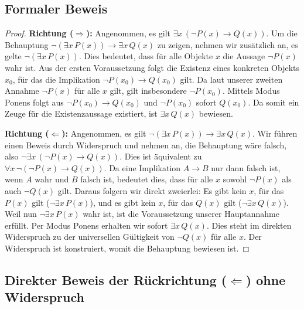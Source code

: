 \documentclass{article}
\begin{document}
\subsection*{Formaler Beweis}
\begin{proof}
\textbf{Richtung ($\Rightarrow$):} Angenommen, es gilt $\exists x \, (\neg P(x) \rightarrow Q(x))$. Um die Behauptung $\neg(\exists x \, P(x)) \rightarrow \exists x \, Q(x)$ zu zeigen, nehmen wir zusätzlich an, es gelte $\neg(\exists x \, P(x))$. Dies bedeutet, dass für alle Objekte $x$ die Aussage $\neg P(x)$ wahr ist.
Aus der ersten Voraussetzung folgt die Existenz eines konkreten Objekts $x_0$, für das die Implikation $\neg P(x_0) \rightarrow Q(x_0)$ gilt. Da laut unserer zweiten Annahme $\neg P(x)$ für alle $x$ gilt, gilt insbesondere $\neg P(x_0)$. Mittels Modus Ponens folgt aus $\neg P(x_0) \rightarrow Q(x_0)$ und $\neg P(x_0)$ sofort $Q(x_0)$. Da somit ein Zeuge für die Existenzaussage existiert, ist $\exists x \, Q(x)$ bewiesen.

\medskip
\textbf{Richtung ($\Leftarrow$):} Angenommen, es gilt $\neg(\exists x \, P(x)) \rightarrow \exists x \, Q(x)$. Wir führen einen Beweis durch Widerspruch und nehmen an, die Behauptung wäre falsch, also $\neg \exists x \, (\neg P(x) \rightarrow Q(x))$.
Dies ist äquivalent zu $\forall x \, \neg(\neg P(x) \rightarrow Q(x))$. Da eine Implikation $A \rightarrow B$ nur dann falsch ist, wenn $A$ wahr und $B$ falsch ist, bedeutet dies, dass für alle $x$ sowohl $\neg P(x)$ als auch $\neg Q(x)$ gilt. Daraus folgern wir direkt zweierlei: Es gibt kein $x$, für das $P(x)$ gilt ($\neg \exists x \, P(x)$), und es gibt kein $x$, für das $Q(x)$ gilt ($\neg \exists x \, Q(x)$).
Weil nun $\neg \exists x \, P(x)$ wahr ist, ist die Voraussetzung unserer Hauptannahme erfüllt. Per Modus Ponens erhalten wir sofort $\exists x \, Q(x)$. Dies steht im direkten Widerspruch zu der universellen Gültigkeit von $\neg Q(x)$ für alle $x$. Der Widerspruch ist konstruiert, womit die Behauptung bewiesen ist.
\end{proof}

\newpage

\subsection*{Direkter Beweis der Rückrichtung ($\Leftarrow$) ohne Widerspruch}
\end{document}
